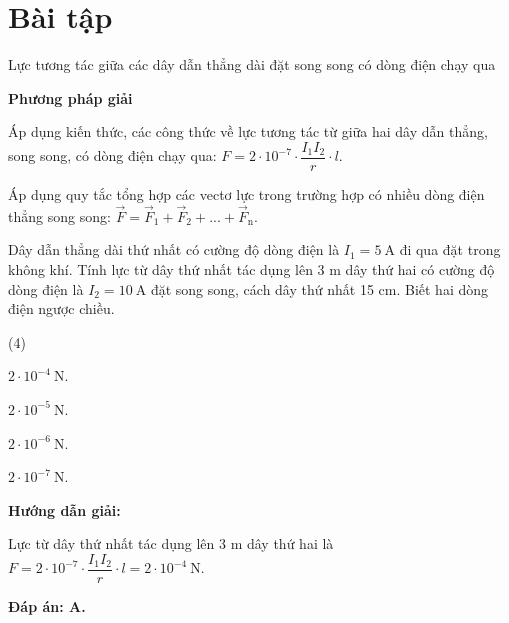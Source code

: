 \section{Bài tập}
\begin{dang}{Lực tương tác giữa các dây dẫn thẳng dài đặt song song có dòng điện chạy qua}
\end{dang}

\textbf{Phương pháp giải}

Áp dụng kiến thức, các công thức về lực tương tác từ giữa hai dây dẫn thẳng, song song, có dòng điện chạy qua: 	$F=2\cdot 10^{-7}\cdot \dfrac{I_1I_2}{r}\cdot l$. 

Áp dụng quy tắc tổng hợp các vectơ lực trong trường hợp có nhiều dòng điện thẳng song song: $\vec{F}=\vec{F}_{1}+\vec{F}_{2}+...+\vec{F}_\text{n}$.







{	
Dây dẫn thẳng dài thứ nhất có cường độ dòng điện là $I_1=5\ \text{A}$ đi qua đặt trong không khí. Tính lực từ dây thứ nhất tác dụng lên 3 m dây thứ hai có cường độ dòng điện là $I_2=10\ \text{A}$  đặt song song, cách dây thứ nhất 15 cm. Biết hai dòng điện ngược chiều.  


	\begin{mcq}(4)
		\item  $2\cdot 10^{-4}\ \text{N}$.
		\item  $2\cdot 10^{-5}\ \text{N}$.
		\item  $2\cdot 10^{-6}\ \text{N}$.
		\item  $2\cdot 10^{-7}\ \text{N}$.
	\end{mcq}
}{	
\begin{center}
		\textbf{Hướng dẫn giải:}
\end{center}
	
Lực từ dây thứ nhất tác dụng lên 3 m dây thứ hai là	$F=2\cdot 10^{-7}\cdot \dfrac{I_1I_2}{r}\cdot l=2\cdot 10^{-4}\ \text{N}$.

	
\textbf{	Đáp án: A.}
}

